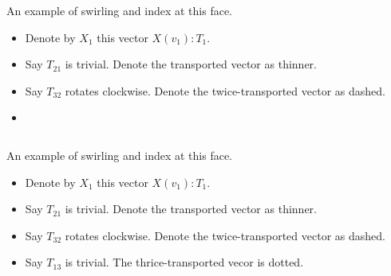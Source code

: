 \begin{frame}
\begin{columns}
\begin{column}{0.65\textwidth}
\vspace{12pt}
\begingroup
{}

\endgroup
\end{column}
\begin{column}{0.35\textwidth}
An example of \alert{swirling} and \alert{index} at this face.
\begin{itemize}
\item<1-> Denote by \( X_1 \) this vector \( X(v_1):T_1 \).
\item<1-> Say \( T_{21} \) is trivial. Denote the transported vector as thinner.
\item<1-> Say \( T_{32} \) rotates clockwise. Denote the twice-transported vector as dashed.
\item<1-> 
\end{itemize}
\end{column}
\end{columns}
\end{frame}

\begin{frame}
\begin{columns}
\begin{column}{0.65\textwidth}
\vspace{12pt}
\begingroup
{}

\endgroup
\end{column}
\begin{column}{0.35\textwidth}
An example of \alert{swirling} and \alert{index} at this face.
\begin{itemize}
\item<1-> Denote by \( X_1 \) this vector \( X(v_1):T_1 \).
\item<1-> Say \( T_{21} \) is trivial. Denote the transported vector as thinner.
\item<1-> Say \( T_{32} \) rotates clockwise. Denote the twice-transported vector as dashed.
\item<1-> Say \( T_{13} \) is trivial. The thrice-transported vecor is dotted.
\end{itemize}
\end{column}
\end{columns}
\end{frame}

